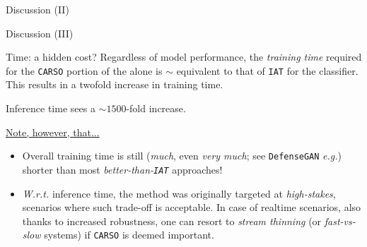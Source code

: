 {\begin{frame}{ Discussion (II)}
    \end{frame}

    \begin{frame}{ Discussion (III)}

        \begin{block}{Time: a hidden cost?}
            Regardless of model performance, the \textit{training time} required for the \texttt{CARSO} portion of the alone is $\sim$ equivalent to that of \texttt{IAT} for the classifier. This results in a twofold increase in training time.

            Inference time sees a $\sim1500$-fold increase.
        \end{block}

    \underline{Note, however, that...}
    \begin{itemize}
        \item Overall training time is still (\textit{much}, even \textit{very much}; see \texttt{DefenseGAN} \textit{e.g.}) shorter than most \textit{better-than-\texttt{IAT}} approaches!
        \item \textit{W.r.t.} inference time, the method was originally targeted at \textit{high-stakes}, scenarios where such trade-off is acceptable. In case of realtime scenarios, also thanks to increased robustness, one can resort to \textit{stream thinning} (or \textit{fast-vs-slow} systems) if \texttt{CARSO} is deemed important.
    \end{itemize}
    \end{frame}

}

